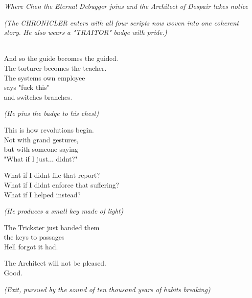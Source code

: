 
\emph{Where Chen the Eternal Debugger joins and the Architect of Despair takes notice}

\bookdivider

\label{performing_arts-closing-of-the-scroll}

\emph{(The CHRONICLER enters with all four scripts now woven into one coherent story. He also wears a "TRAITOR" badge with pride.)}

\\
And so the guide becomes the guided.\\
The torturer becomes the teacher.\\
The system\textquotesingle s own employee\\
says "fuck this"\\
and switches branches.

\emph{(He pins the badge to his chest)}

This is how revolutions begin.\\
Not with grand gestures,\\
but with someone saying\\
"What if I just... didn\textquotesingle t?"

What if I didn\textquotesingle t file that report?\\
What if I didn\textquotesingle t enforce that suffering?\\
What if I helped instead?

\emph{(He produces a small key made of light)}

The Trickster just handed them\\
the keys to passages\\
Hell forgot it had.

The Architect will not be pleased.\\
Good.

\emph{(Exit, pursued by the sound of ten thousand years of habits breaking)}

\bookdivider
